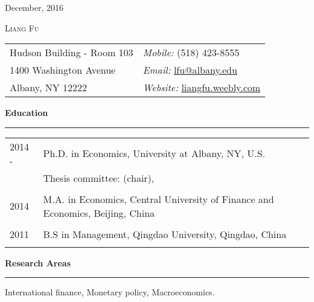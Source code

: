 \documentclass[a4paper, 10pt]{article}
\newcommand{\cvsec}[1]
{
	\needspace{2\baselineskip}
	\noindent \textbf{#1}
	
	\vspace{2pt}
	
	\hrule
	
	\bigskip
}
\newcommand{\cvitem}[2]{#1 & #2 \\ & \\}
\newenvironment{cvfree}[1]
{
	\cvsec{#1}
	}
	{
	\bigskip
}
\newenvironment{cvchrono}[1]
{
	\cvsec{#1}
	\begin{tabu} to \linewidth {X[1,l]X[6,l]} 
}
{
	\end{tabu}
}
\begin{document}
\begin{flushright}
	December, 2016
\end{flushright}






\begin{center}
	\huge \textsc{Liang Fu}
\end{center}

\bigskip \bigskip





\begin{tabu} to \linewidth {X[l]X[r]}
	Hudson Building - Room 103  & \emph{Mobile:} (518) 423-8555 \\
	1400 Washington Avenue     & \emph{Email:} \href{mailto:lfu@albany.edu}{lfu@albany.edu} \\
	Albany, NY 12222            & \emph{Website:}  \href{http://liangfu.weebly.com}{liangfu.weebly.com}
\end{tabu}

\bigskip \bigskip






\begin{cvchrono}{Education}
	\cvitem{2014 - }{Ph.D. in Economics, University at Albany, NY, U.S. \\
		& Thesis committee:   (chair),  } 
	\cvitem{2014}{M.A. in Economics, Central University of Finance and Economics, Beijing, China}
	\cvitem{2011}{B.S in Management, Qingdao University, Qingdao, China}
\end{cvchrono}
\bigskip 



\begin{cvfree}{Research Areas}
	International finance, Monetary policy, Macroeconomics.
\end{cvfree}
\bigskip 
\end{document}
